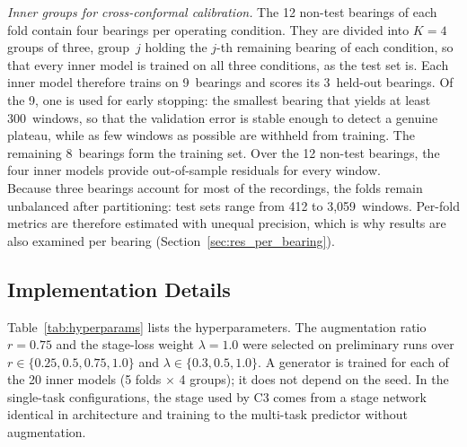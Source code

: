\textit{Inner groups for cross-conformal calibration.} The 12 non-test
bearings of each fold contain four bearings per operating condition.
They are divided into $K = 4$ groups of three, group~$j$ holding the
$j$-th remaining bearing of each condition, so that every inner model
is trained on all three conditions, as the test set is. Each inner
model therefore trains on 9~bearings and scores its 3~held-out
bearings. Of the 9, one is used for early stopping: the smallest
bearing that yields at least 300~windows, so that the validation error
is stable enough to detect a genuine plateau, while as few windows as
possible are withheld from training. The remaining 8~bearings form the
training set. Over the 12 non-test bearings, the four inner models
provide out-of-sample residuals for every window.\\

Because three bearings account for most of the recordings, the folds
remain unbalanced after partitioning: test sets range from 412 to
3,059~windows. Per-fold metrics are therefore estimated with unequal
precision, which is why results are also examined per bearing
(Section~\ref{sec:res_per_bearing}).

\subsection{Implementation Details}
\label{sec:implementation}

Table~\ref{tab:hyperparams} lists the hyperparameters. The augmentation
ratio $r = 0.75$ and the stage-loss weight $\lambda = 1.0$ were
selected on preliminary runs over $r \in \{0.25, 0.5, 0.75, 1.0\}$ and
$\lambda \in \{0.3, 0.5, 1.0\}$. A generator is trained for each of the
20 inner models (5 folds $\times$ 4 groups); it does not depend on the
seed. In the single-task configurations, the stage used by C3 comes
from a stage network identical in architecture and training to the
multi-task predictor without augmentation.


